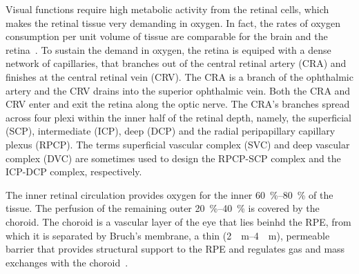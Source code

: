 \documentclass[12pt,a4paper]{journal}
\begin{document}
Visual functions require high metabolic activity from the retinal cells, which makes the retinal tissue very demanding in oxygen.
In fact, the rates of oxygen consumption per unit volume of tissue are comparable for the brain and the retina~\cite{Medrano1995}.
To sustain the demand in oxygen, the retina is equiped with a dense network of capillaries, that branches out of the central retinal artery (CRA) and finishes at the central retinal vein (CRV).
The CRA is a branch of the ophthalmic artery and the CRV drains into the superior ophthalmic vein.
Both the CRA and CRV enter and exit the retina along the optic nerve.
The CRA's branches spread across four plexi within the inner half of the retinal depth, namely, the superficial (SCP), intermediate (ICP), deep (DCP) and the radial peripapillary capillary plexus (RPCP).
The terms superficial vascular complex (SVC) and deep vascular complex (DVC) are sometimes used to design the RPCP-SCP complex and the ICP-DCP complex, respectively.

The inner retinal circulation provides oxygen for the inner \SIrange{60}{80}{\percent} of the tissue.
The perfusion of the remaining outer \SIrange{20}{40}{\percent} is covered by the choroid.
The choroid is a vascular layer of the eye that lies beinhd the RPE, from which it is separated by Bruch's membrane, a thin (\SIrange{2}{4}{\mu\meter}), permeable barrier that provides structural support to the RPE and regulates gas and mass exchanges with the choroid~\cite{Curcio2013}.
\end{document}
